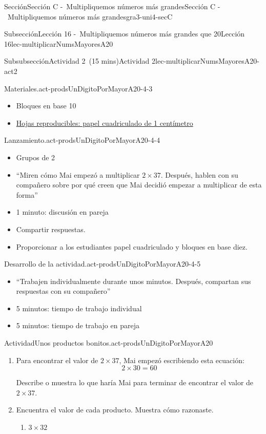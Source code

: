 \documentclass[oneside,10pt,]{article}
\begin{document}
\begin{sectionptx}{Sección}{Sección C -~Multipliquemos números más grandes}{}{Sección C -~Multipliquemos números más grandes}{}{}{gra3-uni4-secC}
\begin{subsectionptx}{Subsección}{Lección 16 -~Multipliquemos números más grandes que 20}{}{Lección 16}{}{}{lec-multiplicarNumsMayoresA20}
\begin{subsubsectionptx}{Subsubsección}{Actividad 2~(15 mins)}{}{Actividad 2}{}{}{lec-multiplicarNumsMayoresA20-act2}
\begin{paragraphs}{Materiales.}{act-prodsUnDigitoPorMayorA20-4-3}
\begin{itemize}[label=\textbullet]
\item{}Bloques en base 10%
\item{}\hyperref[blm-papelCuadriculadoCentimetro]{Hojas reproducibles: papel cuadriculado de 1 centímetro}%
\end{itemize}
\end{paragraphs}%
\begin{paragraphs}{Lanzamiento.}{act-prodsUnDigitoPorMayorA20-4-4}%
%
\begin{itemize}[label=\textbullet]
\item{}Grupos de 2%
\item{}``Miren cómo Mai empezó a multiplicar \(2 \times 37\). Después, hablen con su compañero sobre por qué creen que Mai decidió empezar a multiplicar de esta forma''%
\item{}1 minuto: discusión en pareja%
\item{}Compartir respuestas.%
\item{}Proporcionar a los estudiantes papel cuadriculado y bloques en base diez.%
\end{itemize}
\end{paragraphs}%
\begin{paragraphs}{Desarrollo de la actividad.}{act-prodsUnDigitoPorMayorA20-4-5}%
%
\begin{itemize}[label=\textbullet]
\item{}``Trabajen individualmente durante unos minutos. Después, compartan sus respuestas con su compañero''%
\item{}5 minutos: tiempo de trabajo individual%
\item{}5 minutos: tiempo de trabajo en pareja%
\end{itemize}
\end{paragraphs}%
\begin{activity}{Actividad}{Unos productos bonitos.}{act-prodsUnDigitoPorMayorA20}%
%
\begin{enumerate}
\item{}Para encontrar el valor de \(2\times 37\), Mai empezó escribiendo esta ecuación:%
\begin{equation*}
2 \times 30 = 60
\end{equation*}
%
\par
Describe o muestra lo que haría Mai para terminar de encontrar el valor de \(2\times 37\).%
\item{}Encuentra el valor de cada producto. Muestra cómo razonaste.%
%
\begin{enumerate}
\item{}\(\displaystyle 3\times 32\)%

\end{enumerate}
\end{enumerate}
\end{activity}
\end{subsubsectionptx}
\end{subsectionptx}
\end{sectionptx}
\end{document}
